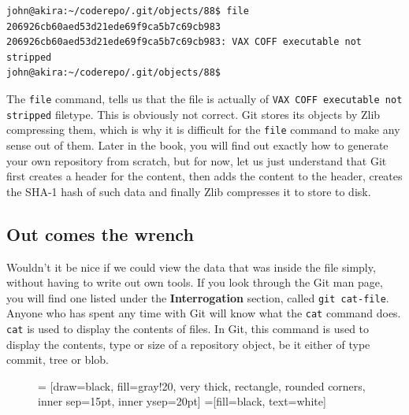 \begin{Verbatim}[frame=leftline,framerule=1mm,fontsize=\relsize{-3}]
john@akira:~/coderepo/.git/objects/88$ file 206926cb60aed53d21ede69f9ca5b7c69cb983 
206926cb60aed53d21ede69f9ca5b7c69cb983: VAX COFF executable not stripped
john@akira:~/coderepo/.git/objects/88$ 
\end{Verbatim}

The \texttt{file} command, tells us that the file is actually of \texttt{VAX COFF executable not stripped} filetype.  This is obviously not correct.  Git stores its objects by Zlib compressing them, which is why it is difficult for the \texttt{file} command to make any sense out of them.  Later in the book, you will find out exactly how to generate your own repository from scratch, but for now, let us just understand that Git first creates a header for the content, then adds the content to the header, creates the SHA-1 hash of such data and finally Zlib compresses it to store to disk.

\subsection{Out comes the wrench}
Wouldn't it be nice if we could view the data that was inside the file simply, without having to write out own tools.  If you look through the Git man page, you will find one listed under the \textbf{Interrogation} section, called \texttt{git cat-file}.  Anyone who has spent any time with Git will know what the \texttt{cat} command does.  \texttt{cat} is used to display the contents of files.  In Git, this command is used to display the contents, type or size of a repository object, be it either of type commit, tree or blob.

\begin{figure}[hbt]
 = [draw=black, fill=gray!20, very thick, rectangle, rounded corners, inner sep=15pt, inner ysep=20pt]
 =[fill=black, text=white]
\end{figure}

